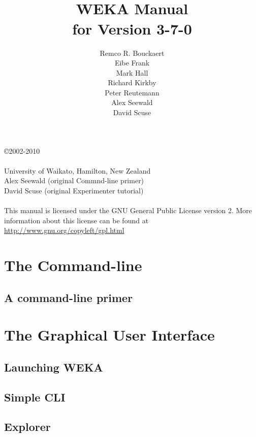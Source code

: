 \documentclass[a4paper]{book}
\title{\epsfig{file=images/coat_of_arms.eps,width=10cm}\vspace{3cm}\\WEKA Manual\\for Version 3-7-0}
\author{Remco R. Bouckaert\\Eibe Frank\\Mark Hall\\Richard Kirkby\\Peter Reutemann\\Alex Seewald\\David Scuse}
\begin{document}
\begin{titlepage}
\maketitle

\thispagestyle{empty}
\center
\begin{table}[b]
\copyright 2002-2010 \\
 \\
University of Waikato, Hamilton, New Zealand \\
Alex Seewald (original Commnd-line primer) \\
David Scuse (original Experimenter tutorial) \\
\\
This manual is licensed under the GNU General Public License version 2. More information about this license can be found at \url{http://www.gnu.org/copyleft/gpl.html}
\end{table}

\end{titlepage}

\tableofcontents

\part{The Command-line}

\chapter{A command-line primer}


\part{The Graphical User Interface}

\chapter{Launching WEKA}


\chapter{Simple CLI}


\chapter{Explorer}

\end{document}
